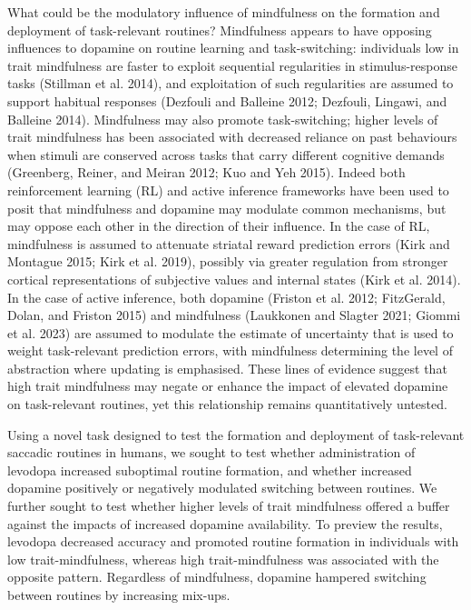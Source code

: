 \documentclass{article}
\begin{document}
What could be the modulatory influence of mindfulness on the formation
and deployment of task-relevant routines? Mindfulness appears to have
opposing influences to dopamine on routine learning and task-switching:
individuals low in trait mindfulness are faster to exploit sequential
regularities in stimulus-response tasks (Stillman et al. 2014), and
exploitation of such regularities are assumed to support habitual
responses (Dezfouli and Balleine 2012; Dezfouli, Lingawi, and Balleine
2014). Mindfulness may also promote task-switching; higher levels of
trait mindfulness has been associated with decreased reliance on past
behaviours when stimuli are conserved across tasks that carry different
cognitive demands (Greenberg, Reiner, and Meiran 2012; Kuo and Yeh
2015). Indeed both reinforcement learning (RL) and active inference
frameworks have been used to posit that mindfulness and dopamine may
modulate common mechanisms, but may oppose each other in the direction
of their influence. In the case of RL, mindfulness is assumed to
attenuate striatal reward prediction errors (Kirk and Montague 2015;
Kirk et al. 2019), possibly via greater regulation from stronger
cortical representations of subjective values and internal states (Kirk
et al. 2014). In the case of active inference, both dopamine (Friston et
al. 2012; FitzGerald, Dolan, and Friston 2015) and mindfulness
(Laukkonen and Slagter 2021; Giommi et al. 2023) are assumed to modulate
the estimate of uncertainty that is used to weight task-relevant
prediction errors, with mindfulness determining the level of abstraction
where updating is emphasised. These lines of evidence suggest that high
trait mindfulness may negate or enhance the impact of elevated dopamine
on task-relevant routines, yet this relationship remains quantitatively
untested.

Using a novel task designed to test the formation and deployment of
task-relevant saccadic routines in humans, we sought to test whether
administration of levodopa increased suboptimal routine formation, and
whether increased dopamine positively or negatively modulated switching
between routines. We further sought to test whether higher levels of
trait mindfulness offered a buffer against the impacts of increased
dopamine availability. To preview the results, levodopa decreased
accuracy and promoted routine formation in individuals with low
trait-mindfulness, whereas high trait-mindfulness was associated with
the opposite pattern. Regardless of mindfulness, dopamine hampered
switching between routines by increasing mix-ups.
\end{document}
